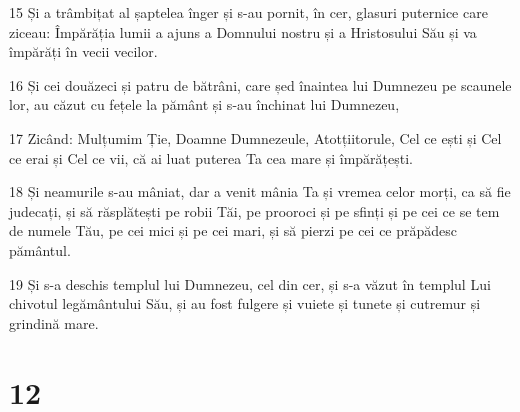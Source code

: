 \par 15 Și a trâmbițat al șaptelea înger și s-au pornit, în cer, glasuri puternice care ziceau: Împărăția lumii a ajuns a Domnului nostru și a Hristosului Său și va împărăți în vecii vecilor.
\par 16 Și cei douăzeci și patru de bătrâni, care șed înaintea lui Dumnezeu pe scaunele lor, au căzut cu fețele la pământ și s-au închinat lui Dumnezeu,
\par 17 Zicând: Mulțumim Ție, Doamne Dumnezeule, Atotțiitorule, Cel ce ești și Cel ce erai și Cel ce vii, că ai luat puterea Ta cea mare și împărățești.
\par 18 Și neamurile s-au mâniat, dar a venit mânia Ta și vremea celor morți, ca să fie judecați, și să răsplătești pe robii Tăi, pe prooroci și pe sfinți și pe cei ce se tem de numele Tău, pe cei mici și pe cei mari, și să pierzi pe cei ce prăpădesc pământul.
\par 19 Și s-a deschis templul lui Dumnezeu, cel din cer, și s-a văzut în templul Lui chivotul legământului Său, și au fost fulgere și vuiete și tunete și cutremur și grindină mare.

\chapter{12}

